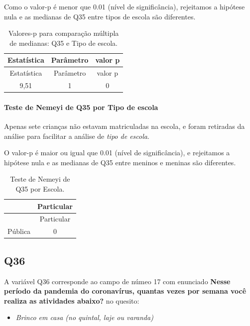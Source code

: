 \documentclass[]{article}
\providecommand{\tightlist}{%
  \setlength{\itemsep}{0pt}\setlength{\parskip}{0pt}}
\let\oldparagraph\paragraph
\renewcommand{\paragraph}[1]{\oldparagraph{#1}\mbox{}}
\begin{document}
Como o valor-p é menor que 0.01 (nível de significância), rejeitamos a hipótese nula e as medianas de Q35 entre tipos de escola são diferentes.

\begin{longtable}[]{@{}ccc@{}}
\caption{\label{tab:unnamed-chunk-1298}Valores-p para comparação múltipla de medianas: Q35 e Tipo de escola.}\tabularnewline
\toprule
Estatística & Parâmetro & valor p\tabularnewline
\midrule
\endfirsthead
\toprule
Estatística & Parâmetro & valor p\tabularnewline
\midrule
\endhead
9,51 & 1 & 0\tabularnewline
\bottomrule
\end{longtable}

\hypertarget{teste-de-nemeyi-de-q35-por-tipo-de-escola}{%
\paragraph{Teste de Nemeyi de Q35 por Tipo de escola}\label{teste-de-nemeyi-de-q35-por-tipo-de-escola}}

Apenas sete crianças não estavam matriculadas na escola, e foram retiradas da análise para facilitar a análise de \emph{tipo de escola}.

O valor-p é maior ou igual que 0.01 (nível de significância), e rejeitamos a hipótese nula e as medianas de Q35 entre meninos e meninas são diferentes.

\begin{longtable}[]{@{}lc@{}}
\caption{\label{tab:unnamed-chunk-1300}Teste de Nemeyi de Q35 por Escola.}\tabularnewline
\toprule
& Particular\tabularnewline
\midrule
\endfirsthead
\toprule
& Particular\tabularnewline
\midrule
\endhead
Pública & 0\tabularnewline
\bottomrule
\end{longtable}

\cleardoublepage

\hypertarget{q36}{%
\subsection{Q36}\label{q36}}

A variável Q36 corresponde ao campo de númeo 17 com enunciado \textbf{Nesse período da pandemia do coronavírus, quantas vezes por semana você realiza as atividades abaixo?} no quesito:

\begin{itemize}
\tightlist
\item
  \emph{Brinco em casa (no quintal, laje ou varanda)}
\end{itemize}
\end{document}
